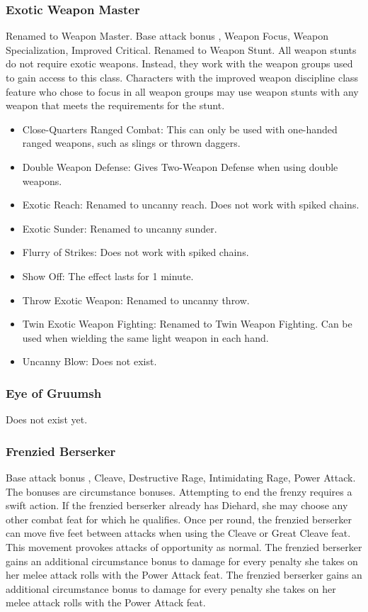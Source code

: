 \subsubsection{Exotic Weapon Master}
Renamed to Weapon Master.
 Base attack bonus , Weapon Focus, Weapon Specialization, Improved Critical.
 Renamed to Weapon Stunt. All weapon stunts do not require exotic weapons. Instead, they work with the weapon groups used to gain access to this class. Characters with the improved weapon discipline class feature who chose to focus in all weapon groups may use weapon stunts with any weapon that meets the requirements for the stunt.
\begin{itemize}
\item Close-Quarters Ranged Combat: This can only be used with one-handed ranged weapons, such as slings or thrown daggers.
\item Double Weapon Defense: Gives Two-Weapon Defense when using double weapons.
\item Exotic Reach: Renamed to uncanny reach. Does not work with spiked chains.
\item Exotic Sunder: Renamed to uncanny sunder.
\item Flurry of Strikes: Does not work with spiked chains.
\item Show Off: The effect lasts for 1 minute.
\item Throw Exotic Weapon: Renamed to uncanny throw.
\item Twin Exotic Weapon Fighting: Renamed to Twin Weapon Fighting. Can be used when wielding the same light weapon in each hand. 
\item Uncanny Blow: Does not exist.
\end{itemize}
\subsubsection{Eye of Gruumsh}
Does not exist yet.
\subsubsection{Frenzied Berserker}
 Base attack bonus , Cleave, Destructive Rage, Intimidating Rage, Power Attack.
 The bonuses are circumstance bonuses. Attempting to end the frenzy requires a swift action.
 If the frenzied berserker already has Diehard, she may choose any other combat feat for which he qualifies.
 Once per round, the frenzied berserker can move five feet between attacks when using the Cleave or Great Cleave feat. This movement provokes attacks of opportunity as normal.
 The frenzied berserker gains an additional  circumstance bonus to damage for every  penalty she takes on her melee attack rolls with the Power Attack feat.
 The frenzied berserker gains an additional  circumstance bonus to damage for every  penalty she takes on her melee attack rolls with the Power Attack feat.
